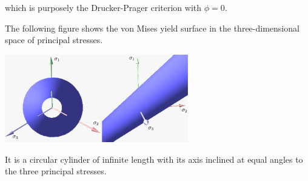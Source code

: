 which is purposely the Drucker-Prager criterion with $\phi=0$.


The following figure shows the von Mises yield surface in the three-dimensional space of principal stresses. 
\begin{center}
\includegraphics[width=0.6\textwidth]{images/rheology/vonmises/vonmises.pdf}
\end{center}
It is a circular cylinder of infinite length with its axis inclined at equal angles to the three principal stresses. 

